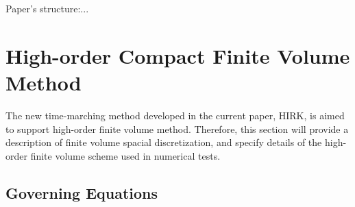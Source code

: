 \documentclass[preprint,12pt]{elsarticle}
\begin{document}
Paper's structure:...%

\section{High-order Compact Finite Volume Method}
\label{sec:CFV}

\newcommand{\U}{\mathbf{U}}
\newcommand{\F}{\mathbf{F}}
\newcommand{\x}{\mathbf{x}}

The new time-marching method developed in
the current paper, HIRK, is aimed to support
high-order finite volume method.
Therefore,
this section will provide a description of
finite volume spacial discretization,
and specify details
of the high-order finite volume scheme
used in numerical tests.

\subsection{Governing Equations}
\label{ssec:GovEq}
\end{document}
